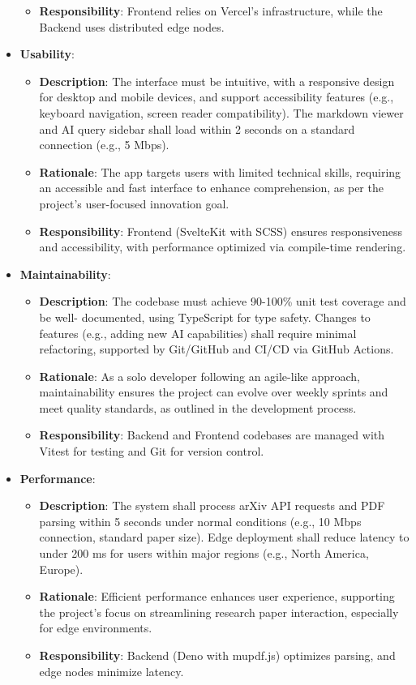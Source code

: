 \documentclass[12pt]{article}
\begin{document}
\begin{itemize}
\begin{itemize}
      \item \textbf{Responsibility}: Frontend relies on Vercel's infrastructure, while the Backend uses distributed edge nodes.
    \end{itemize}
  \item \textbf{Usability}:
    \begin{itemize}
      \item \textbf{Description}: The interface must be intuitive, with a responsive design for desktop and mobile devices, and support accessibility features (e.g., keyboard navigation, screen reader compatibility). The markdown viewer and AI query sidebar shall load within 2 seconds on a standard connection (e.g., 5 Mbps).
      \item \textbf{Rationale}: The app targets users with limited technical skills, requiring an accessible and fast interface to enhance comprehension, as per the project's user-focused innovation goal.
      \item \textbf{Responsibility}: Frontend (SvelteKit with SCSS) ensures responsiveness and accessibility, with performance optimized via compile-time rendering.
    \end{itemize}
  \item \textbf{Maintainability}:
    \begin{itemize}
      \item \textbf{Description}: The codebase must achieve 90-100\% unit test coverage and be well- documented, using TypeScript for type safety. Changes to features (e.g., adding new AI capabilities) shall require minimal refactoring, supported by Git/GitHub and CI/CD via GitHub Actions.
      \item \textbf{Rationale}: As a solo developer following an agile-like approach, maintainability ensures the project can evolve over weekly sprints and meet quality standards, as outlined in the development process.
      \item \textbf{Responsibility}: Backend and Frontend codebases are managed with Vitest for testing and Git for version control.
    \end{itemize}
  \item \textbf{Performance}:
    \begin{itemize}
      \item \textbf{Description}: The system shall process arXiv API requests and PDF parsing within 5 seconds under normal conditions (e.g., 10 Mbps connection, standard paper size). Edge deployment shall reduce latency to under 200 ms for users within major regions (e.g., North America, Europe).
      \item \textbf{Rationale}: Efficient performance enhances user experience, supporting the project's focus on streamlining research paper interaction, especially for edge environments.
      \item \textbf{Responsibility}: Backend (Deno with mupdf.js) optimizes parsing, and edge nodes minimize latency.
    \end{itemize}
\end{itemize}
\end{document}
